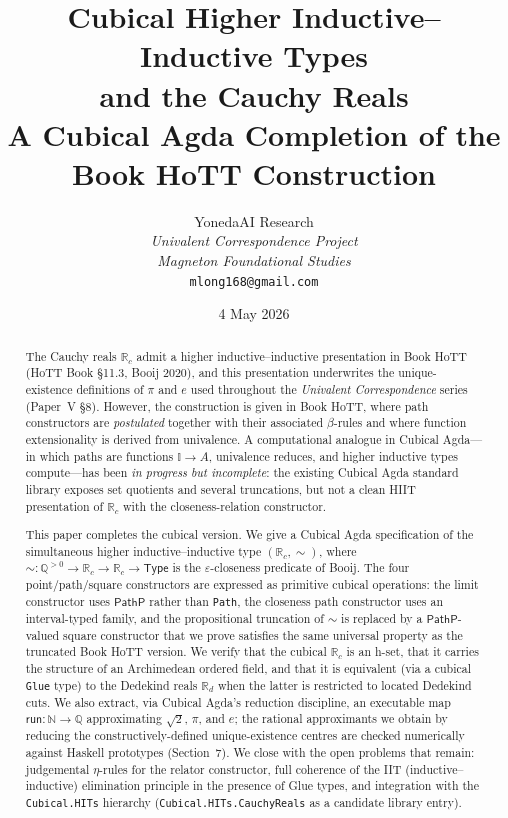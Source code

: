 \documentclass[12pt]{article}
\title{Cubical Higher Inductive--Inductive Types\\
       and the Cauchy Reals\\
\large A Cubical Agda Completion of the Book HoTT Construction}
\author{YonedaAI Research \\
\textit{Univalent Correspondence Project} \\
\textit{Magneton Foundational Studies} \\
\texttt{mlong168@gmail.com}}
\date{4 May 2026}
\theoremstyle{definition}
\theoremstyle{remark}
\newcommand{\Type}{\mathsf{Type}}
\newcommand{\Q}{\mathbb{Q}}
\newcommand{\Rc}{\mathbb{R}_{c}}
\newcommand{\Rd}{\mathbb{R}_{d}}
\newcommand{\PathP}{\mathsf{PathP}}
\newcommand{\II}{\mathbb{I}}
\newcommand{\close}{\mathrel{\sim}}
\begin{document}
\maketitle

\begin{abstract}
The Cauchy reals $\Rc$ admit a higher inductive--inductive presentation in
Book HoTT (HoTT Book \S 11.3, Booij 2020), and this presentation underwrites
the unique-existence definitions of $\pi$ and $e$ used throughout the
\emph{Univalent Correspondence} series (Paper~V \S 8). However, the
construction is given in Book HoTT, where path constructors are
\emph{postulated} together with their associated $\beta$-rules and where
function extensionality is derived from univalence. A computational analogue
in Cubical Agda---in which paths are functions $\II \to A$, univalence
reduces, and higher inductive types compute---has been
\emph{in progress but incomplete}: the existing Cubical Agda standard
library exposes set quotients and several truncations, but not a clean
HIIT presentation of $\Rc$ with the closeness-relation constructor.

This paper completes the cubical version. We give a Cubical
Agda specification of the simultaneous higher inductive--inductive type
$(\Rc, \close)$, where $\close : \Q^{>0} \to \Rc \to \Rc \to \Type$ is the
$\varepsilon$-closeness predicate of Booij. The four point/path/square
constructors are expressed as primitive cubical operations: the limit
constructor uses $\PathP$ rather than \texttt{Path}, the closeness path
constructor uses an interval-typed family, and the propositional
truncation of $\close$ is replaced by a $\PathP$-valued square
constructor that we prove satisfies the same universal property as the
truncated Book HoTT version. We verify that the cubical $\Rc$ is an h-set,
that it carries the structure of an Archimedean ordered field, and that it
is equivalent (via a cubical \texttt{Glue} type) to the Dedekind reals
$\Rd$ when the latter is restricted to located Dedekind cuts. We also
extract, via Cubical Agda's reduction discipline, an executable map
$\mathsf{run} : \mathbb{N} \to \Q$ approximating $\sqrt{2}$, $\pi$, and $e$;
the rational approximants we obtain by reducing the constructively-defined
unique-existence centres are checked numerically against Haskell prototypes
(Section~7). We close with the open problems that remain: judgemental
$\eta$-rules for the relator constructor, full coherence of the IIT
(inductive--inductive) elimination principle in the presence of Glue
types, and integration with the \texttt{Cubical.HITs} hierarchy
(\texttt{Cubical.HITs.CauchyReals} as a candidate library entry).
\end{abstract}
\end{document}
